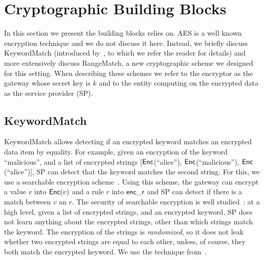 


\section{Cryptographic Building Blocks}
\label{sec:buildingblocks}

In this section we present the building blocks \sys relies on.
AES is a well known encryption technique and we do not discuss it here. Instead, we briefly discuss KeywordMatch (introduced by~\cite{blindbox}, to which we refer the reader for details) and more extensively discuss RangeMatch, a new cryptographic scheme we designed for this setting.
When describing these schemes we refer to the encryptor as the gateway whose secret key is $k$ and to the entity computing on the encrypted data as the service provider (SP).


\subsection{KeywordMatch}\label{s:kwmatch}


KeywordMatch allows detecting if an encrypted keyword matches an encrypted data item by equality.
For example, given an encryption of the keyword ``malicious'', and a list of encrypted strings  [$\mathsf{Enc}$(``alice''), $\mathsf{Enc}$(``malicious''), $\mathsf{Enc}$(``alice'')], SP can  detect that the keyword matches the second string. 
For  this, we use a searchable encryption scheme~\cite{song:search, blindbox}.
Using this scheme, the gateway can encrypt a value $v$ into $\mathsf{Enc}(v)$ and a rule $r$ into $\mathsf{enc\_r}$ and SP can detect if there is a match between $v$ an $r$. 
 The security of searchable encryption is well studied~\cite{song:search, blindbox}: at a high level,  given a list of encrypted strings, and an encrypted keyword, SP does not learn anything about the encrypted strings, other than which strings match the keyword. 
 The encryption of the strings is {\em randomized}, so it does not leak whether two encrypted strings are equal to each other, unless, of course, they both match the encrypted keyword. 
  We use the technique from~\cite{blindbox}.


